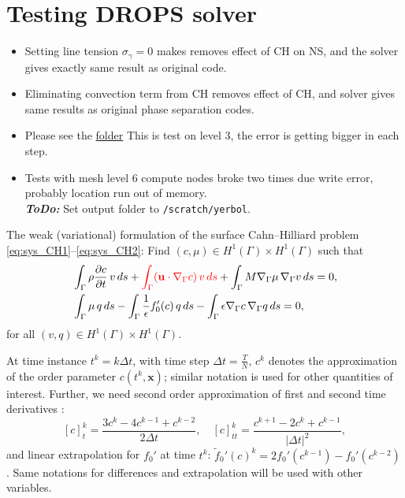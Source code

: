 \documentclass{article}
\newcommand{\bu}{\mathbf u}
\newcommand{\bx}{\mathbf x}
\newcommand{\gradG}{\nabla_{\Gamma}}
\newcommand{\nablaG}{\nabla_{\Gamma}}
\begin{document}
\section{Testing DROPS solver}
\begin{itemize}
	
	
	\item Setting line tension $\sigma_\gamma=0$ makes removes effect of CH on NS, and the solver gives exactly same result as original code.
	
	\item Eliminating convection term from CH removes effect of CH, and solver gives same results as original phase separation codes.
	
	\item Please see the \href{https://www.dropbox.com/sh/bun3sdmbkw9bgax/AAD5kkeIuiPMgwdWsmpdHpFFa?dl=0}{folder} This is test on level 3, the error is getting bigger in each step.
	
	\item Tests with mesh level 6 compute nodes broke two times due write error, probably location run out of memory.\\ \textbf{\textit{ToDo:}} Set output folder to \verb|/scratch/yerbol|. 
\end{itemize}
\newpage

The weak (variational) formulation of the surface Cahn--Hilliard problem \eqref{eq:sys_CH1}--\eqref{eq:sys_CH2}: Find $(c,\mu) \in H^1(\Gamma) \times H^1(\Gamma)$ %
such that
\begin{align}
&\int_\Gamma \rho \frac{\partial c}{\partial t} \,v \, ds +{\color{red} \int_\Gamma (\bu\cdot\nablaG c)\, v\, ds} + \int_\Gamma M \gradG \mu \, \gradG v \, ds = 0, \label{eq:sys_CH1_weak} \\
&\int_\Gamma  \mu \,q \, ds - \int_\Gamma \frac{1}{\epsilon}f_0'(c) \,q \, ds - \int_\Gamma \epsilon \gradG c \, \gradG q \, ds = 0, \label{eq:sys_CH2_weak}
\end{align}
for all $ (v,q) \in H^1(\Gamma) \times H^1(\Gamma)$.


At time instance $t^k=k\Delta t$, with time step $\Delta t=\frac{T}{N}$,  $c^k$ denotes the approximation of the order parameter $c(t^k, \bx)$;  similar notation is used for other quantities of interest. Further, we need second order approximation of first and second time derivatives :
 \begin{equation}\label{BDF2}
\left[c\right]_t^{k} =\frac{3c^{k}-4c^{k-1}+c^{k-2}}{2\Delta t},\quad
\left[c\right]_{tt}^{k} =\frac{c^{k+1}-2c^{k}+c^{k-1}}{|\Delta t|^2},
\end{equation}
and linear extrapolation for $f_0'$ at time $t^k$: $\widetilde f_0'(c)^k=2f_0'(c^{k-1})- f_0'(c^{k-2})$. Same notations for differences and extrapolation will be used with other variables.
\end{document}
